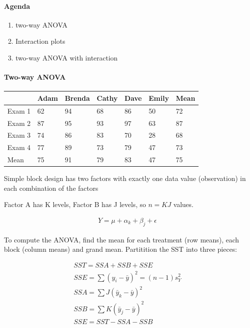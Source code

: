 \documentclass[10pt]{article}\usepackage[]{graphicx}\usepackage[]{color}
\begin{document}
\paragraph{Agenda}
\begin{enumerate}
  \itemsep0em
  \item two-way ANOVA
  \item Interaction plots
  \item two-way ANOVA with interaction
\end{enumerate}



\paragraph{Two-way ANOVA}

\begin{table}[htbp]
\begin{tabular}{l|lllll|l}
& Adam & Brenda & Cathy & Dave & Emily & Mean \\ \hline
Exam 1 & 62 & 94 & 68 & 86 & 50 & 72 \\
Exam 2 & 87 & 95 & 93 & 97 & 63 & 87 \\
Exam 3 & 74 & 86 & 83 & 70 & 28 & 68 \\
Exam 4 & 77 & 89 & 73 & 79 & 47 & 73 \\ \hline
Mean & 75 & 91 & 79 & 83 & 47 & 75 \\
\end{tabular}
\end{table}

Simple block design has two factors with exactly one data value (observation) in each combination of the factors

Factor A has K levels, Factor B has J levels, so $n = KJ$ values.

\begin{eqnarray*}
Y = \mu + \alpha_k + \beta_j + \epsilon
\end{eqnarray*}


To compute the ANOVA, find the mean for each treatment (row means), each block (column means) and grand mean. Partitition the SST into three pieces:

\begin{eqnarray*}
SST = SSA + SSB + SSE \\
SSE = \sum(y_i-\bar{y})^2 = (n-1)s_Y^2 \\
SSA = \sum J(\bar{y}_k-\bar{y})^2 \\
SSB = \sum K(\bar{y}_j-\bar{y})^2 \\
SSE = SST - SSA - SSB
\end{eqnarray*}
\end{document}
